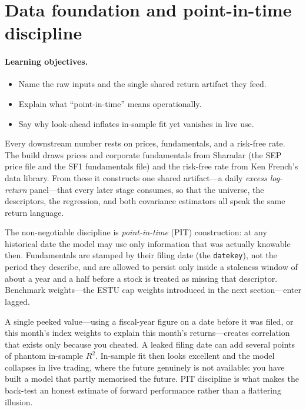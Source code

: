 \documentclass[11pt]{article}
\theoremstyle{definition}
\theoremstyle{plain}
\theoremstyle{remark}
\begin{document}
\section{Data foundation and point-in-time discipline}\label{sec:data}

\paragraph{Learning objectives.}
\begin{itemize}[leftmargin=1.4em,nosep]
  \item Name the raw inputs and the single shared return artifact they feed.
  \item Explain what ``point-in-time'' means operationally.
  \item Say why look-ahead inflates in-sample fit yet vanishes in live use.
\end{itemize}

Every downstream number rests on prices, fundamentals, and a risk-free rate. The build draws prices and corporate fundamentals from Sharadar (the SEP price file and the SF1 fundamentals file) and the risk-free rate from Ken French's data library. From these it constructs one shared artifact---a daily \emph{excess log-return} panel---that every later stage consumes, so that the universe, the descriptors, the regression, and both covariance estimators all speak the same return language.

The non-negotiable discipline is \emph{point-in-time} (PIT) construction: at any historical date the model may use only information that was actually knowable then. Fundamentals are stamped by their filing date (the \texttt{datekey}), not the period they describe, and are allowed to persist only inside a staleness window of about a year and a half before a stock is treated as missing that descriptor. Benchmark weights---the ESTU cap weights introduced in the next section---enter lagged.

\begin{pitfall}
A single peeked value---using a fiscal-year figure on a date before it was filed, or this month's index weights to explain this month's returns---creates correlation that exists only because you cheated. A leaked filing date can add several points of phantom in-sample $R^2$. In-sample fit then looks excellent and the model collapses in live trading, where the future genuinely is not available: you have built a model that partly memorised the future. PIT discipline is what makes the back-test an honest estimate of forward performance rather than a flattering illusion.
\end{pitfall}
\end{document}
